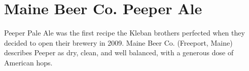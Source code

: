 \documentclass[10pt,oneside]{scrbook}
\begin{document}
\chapter*{Maine Beer Co. Peeper Ale}

\begin{aboutblock}
Peeper Pale Ale was the first recipe the Kleban brothers perfected when they decided
to open their brewery in 2009. Maine Beer Co. (Freeport, Maine) describes Peeper as dry,
clean, and well balanced, with a generous dose of American hops.
\end{aboutblock}


\begin{methodandtiming}
 
\begin{mashsteps}
\end{mashsteps}

\begin{fermentationsteps}
\end{fermentationsteps}

\end{methodandtiming}

\pagebreak

\begin{ingredientsblock}

\begin{malts}
\end{malts}

\begin{hops}
\end{hops}

\begin{yeasts}
\end{yeasts}

\end{ingredientsblock}
\end{document}

